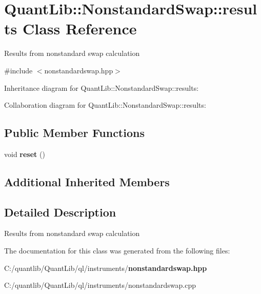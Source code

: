 \section{Quant\+Lib\+:\+:Nonstandard\+Swap\+:\+:results Class Reference}
\label{class_quant_lib_1_1_nonstandard_swap_1_1results}


Results from nonstandard swap calculation  




{\ttfamily \#include $<$nonstandardswap.\+hpp$>$}



Inheritance diagram for Quant\+Lib\+:\+:Nonstandard\+Swap\+:\+:results\+:


Collaboration diagram for Quant\+Lib\+:\+:Nonstandard\+Swap\+:\+:results\+:
\subsection*{Public Member Functions}
\begin{DoxyCompactItemize}
\item 
void {\bfseries reset} ()\label{class_quant_lib_1_1_nonstandard_swap_1_1results_a7229916315b978ebd1c4fd32e750a1e1}

\end{DoxyCompactItemize}
\subsection*{Additional Inherited Members}


\subsection{Detailed Description}
Results from nonstandard swap calculation 

The documentation for this class was generated from the following files\+:\begin{DoxyCompactItemize}
\item 
C\+:/quantlib/\+Quant\+Lib/ql/instruments/{\bf nonstandardswap.\+hpp}\item 
C\+:/quantlib/\+Quant\+Lib/ql/instruments/nonstandardswap.\+cpp\end{DoxyCompactItemize}
